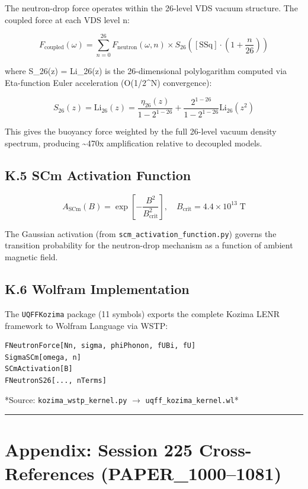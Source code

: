 \documentclass[11pt]{article}
\begin{document}
The neutron-drop force operates within the 26-level VDS vacuum structure. The coupled force at each VDS level n:

$$F_{\mathrm{coupled}}(\omega) = \sum_{n=0}^{26} F_{\mathrm{neutron}}(\omega, n) \times S_{26}\!\left([\text{SSq}] \cdot \left(1 + \frac{n}{26}\right)\right)$$

where S\_26(z) = Li\_26(z) is the 26-dimensional polylogarithm computed via Eta-function Euler acceleration (O(1/2\textasciicircum{}N) convergence):

$$S_{26}(z) = \text{Li}_{26}(z) = \frac{\eta_{26}(z)}{1 - 2^{1-26}} + \frac{2^{1-26}}{1 - 2^{1-26}} \text{Li}_{26}(z^2)$$

This gives the buoyancy force weighted by the full 26-level vacuum density spectrum, producing \textasciitilde{}470x amplification relative to decoupled models.

\subsection*{K.5 SCm Activation Function}

$$A_{\mathrm{SCm}}(B) = \exp\!\left[-\frac{B^2}{B_{\mathrm{crit}}^2}\right], \quad B_{\mathrm{crit}} = 4.4 \times 10^{13} \;\text{T}$$

The Gaussian activation (from \verb|scm_activation_function.py|) governs the transition probability for the neutron-drop mechanism as a function of ambient magnetic field.

\subsection*{K.6 Wolfram Implementation}

The \verb|UQFFKozima| package (11 symbols) exports the complete Kozima LENR framework to Wolfram Language via WSTP:

\begin{verbatim}
FNeutronForce[Nn, sigma, phiPhonon, fUBi, fU]
SigmaSCm[omega, n]
SCmActivation[B]
FNeutronS26[..., nTerms]
\end{verbatim}

*Source: \verb|kozima_wstp_kernel.py| $\to$ \verb|uqff_kozima_kernel.wl|*

\noindent\rule{\textwidth}{0.4pt}

\section*{Appendix: Session 225 Cross-References (PAPER\_1000--1081)}
\end{document}
